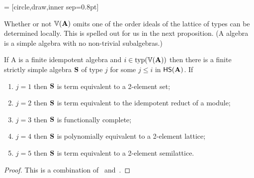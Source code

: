 \newcommand{\dotsize}{0.8pt}
 = [circle,draw,inner sep=\dotsize]
\begin{center}
\newcommand{\figscale}{.7}
\end{center}
Whether or not $\operatorname{\mathbb{V}}(\mathbf{A})$ omits one of the order ideals of the lattice of types can be
determined locally.  This is spelled out for us in the next proposition.
(A  algebra is a simple
algebra with no non-trivial subalgebras.)


\begin{prop}
  \label{prop:2.1}
If A is a finite idempotent algebra and $i \in \operatorname{typ}(\operatorname{\mathbb{V}}(\mathbf{A}))$ then there
is a finite strictly simple algebra $\mathbf{S}$ of type $j$ for some $j \leq i$ in $\mathsf{H} \mathsf{S} (\mathbf{A})$.
If
\begin{enumerate}[(1)]
\item 
  $j = 1$ then $\mathbf{S}$ is term equivalent to a 2-element set;
\item
  $j = 2$ then $\mathbf{S}$ is term equivalent to the idempotent reduct of a module;
\item
  $j = 3$ then $\mathbf{S}$ is functionally complete;
\item
  $j = 4$ then $\mathbf{S}$ is polynomially equivalent to a 2-element lattice;
\item
  $j = 5$ then $\mathbf{S}$ is term equivalent to a 2-element semilattice.
\end{enumerate}
\end{prop}
\begin{proof}
  This is a combination of~\cite[Prop.~3.1]{MR2504025} and~\cite[Thm.~6.1]{MR1191235}.
\end{proof}

